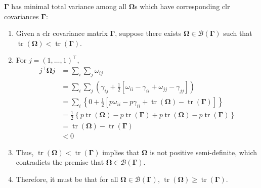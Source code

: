 \documentclass[12pt, letterpaper]{article}
\DeclareMathOperator{\tr}{\text{tr}}
\begin{document}
$\bm{\Gamma}$ has minimal total variance among all $\bm{\Omega}$s which have corresponding clr covariances $\bm{\Gamma}$:
\begin{enumerate}
\item Given a clr covariance matrix $\bm{\Gamma}$, suppose there exists $\bm{\Omega} \in \mathscr{B}(\bm{\Gamma})$ such that $\tr(\bm{\Omega}) < \tr(\bm{\Gamma})$.
\item For $j = (1, \dots, 1)^\intercal$,
\begin{align}
j^\intercal \bm{\Omega} j &= \sum_i \sum_j \omega_{ij} \\
&= \sum_i \sum_j (\gamma_{ij} + \frac{1}{2}[\omega_{ii} - \gamma_{ii} + \omega_{jj} - \gamma_{jj}]) \\
&= \sum_i \left\{ 0 + \frac{1}{2} \left[ p\omega_{ii} - p\gamma_{ii} + \tr(\bm{\Omega}) - \tr(\bm{\Gamma}) \right] \right\} \\
&= \frac{1}{2} \left\{ p\tr(\bm{\Omega}) - p\tr(\bm{\Gamma}) + p\tr(\bm{\Omega}) - p\tr(\bm{\Gamma}) \right\} \\
&= \tr(\bm{\Omega}) - \tr(\bm{\Gamma}) \\
&< 0
\end{align}
\item Thus, $\tr(\bm{\Omega}) < \tr(\bm{\Gamma})$ implies that $\bm{\Omega}$ is not positive semi-definite, which contradicts the premise that $\bm{\Omega} \in \mathscr{B}(\bm{\Gamma})$.
\item Therefore, it must be that for all $\bm{\Omega} \in \mathscr{B}(\bm{\Gamma})$, $\tr(\bm{\Omega}) \geq \tr(\bm{\Gamma})$.
\end{enumerate}
\end{document}
